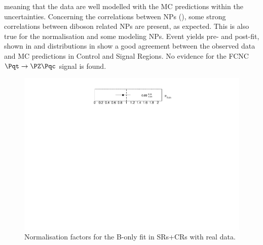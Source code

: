 meaning that the data are well modelled with the MC predictions within the uncertainties.
Concerning the correlations between NPs
(), some strong correlations
between diboson related NPs are present, as expected. This is also
true for the \ttbar normalisation and some \ttbar modeling NPs. 
Event yields pre- and post-fit, shown in  and distributions in  show a good agreement between the observed data and MC predictions in Control and Signal Regions. No evidence for the FCNC $\mathrm{\Pqt\rightarrow\PZ\Pqc}$ signal is found.

\begin{figure}[htbp]
	\centering
	\includegraphics[width=.5\textwidth]{Chapters/CH8/figures/BONLY_CRSR_DL1rc_unblind/NormFactors}
	\caption{Normalisation factors for the B-only \tZc fit in SRs+CRs with real data.}%
	\label{fig:stat:tzc:splusb:crsr:norm_unb}
\end{figure}

